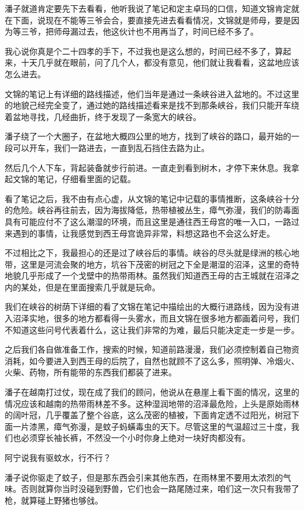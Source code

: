 潘子就道肯定要先下去看看，他听我说了笔记和定主卓玛的口信，知道文锦肯定就在下面，说现在不能等三爷会合，要直接先进去看看情况，文锦就是师母，要是因为等三爷，把师母漏过去，他这伙计也不用再当了，时间已经不多了。

我心说你真是个二十四孝的手下，不过我也是这么想的，时间已经不多了，算起来，十天几乎就在眼前，问了几个人，都没有意见，他们就让我看看，这盆地应该怎么进去。

文锦的笔记上有详细的路线描述，他们当年是通过一条峡谷进入盆地的。不过这里的地貌己经完全变了，通过她的路线描述看来是找不到那条峡谷，我们只能开车绕着盆地寻找，几经曲折，终于发现了一条宽大的峡谷。

潘子绕了一个大圈子，在盆地大概四公里的地方，找到了峡谷的路口，最开始的一段可以开车，我们一路进去，一直到乱石挡住去路为止。

然后几个人下车，背起装备就步行前进。一直走到看到树木，才停下来休息。我拿起文锦的笔记，仔细看里面的记载。

看了笔记之后，我不由有点心虚，从文锦的笔记中记载的事情推断，这条峡谷十分的危险。峡谷再往前去，因为海拔降低，热带植被丛生，瘴气弥漫，我们的防毒面具有可能应付不了这么潮湿的环境，而且这里是通往西王母宫的唯一入口，一路过来遇到的事情，让我感觉到西王母宫诡异非常，料想这路也不会这么好走。

不过相比之下，我最担心的还是过了峡谷后的事情。峡谷的尽头就是绿洲的核心地带，这里是河流会聚的地方，坑谷下茂密的树冠之下全是潮湿的沼泽，这里的奇特地貌几乎形成了一个戈壁中的热带雨林。虽然我们知道西王母的古王城就在沼泽之内的某处，但是在里面搜索几乎就是玩命。

我们在峡谷的树荫下详细的看了文锦在笔记中描绘出的大概行进路线，因为没有进入沼泽实地，很多的地方都看得一头雾水，而且文锦在很多地方都画着问号，我们不知道这些问号代表着什么，这让我们非常的为难，最后只能决定走一步是一步。

之后我们各自做准备工作，搜索的时候，知道前路漫漫，我们必须控制着自己物资消耗，如今要进入到西王母的后院了，自然也就顾不了这么多，照明弹、冷烟火、火柴、药物，所有能带的东西我们都装了进来。

潘子在越南打过仗，现在成了我们的顾问，他说从在悬崖上看下面的情况，这里的情况应该和越南的热带雨林差不多。这种湿润地带的沼泽最危险，上头是原始雨林的阔叶冠，几乎覆盖了整个谷底，这么茂密的植被，下面肯定透不过阳光，树冠下面一片漆黑，瘴气弥漫，是蚊子蚂蟥毒虫的天下。尽管这里的气温超过三十度，我们也必须穿长袖长裤，不然没一个小时你身上绝对一块好肉都没有。

阿宁说我有驱蚊水，行不行？

潘子说你驱走了蚊子，但是那东西会引来其他东西，在雨林里不要用太浓烈的气味。否则就算你当时没碰到野兽，它们也会一路尾随过来，咱们这一次只有我带了枪，就算碰上野猪也够戗。

